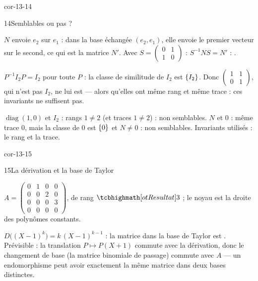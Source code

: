 \begin{blocLivre}{cor-13-14}
\begin{corrige}{14}{Semblables ou pas ?}
\begin{questions}
  \item $N$ envoie $e_2$ sur $e_1$ : dans la base échangée $(e_2,e_1)$,
    elle envoie le premier vecteur sur le second, ce qui est la matrice
    $N'$. Avec $S=\begin{pmatrix}0&1\\1&0\end{pmatrix}$ :
    $S^{-1}NS=N'$ : .
  \item $P^{-1}I_2P=I_2$ pour toute $P$ : la classe de similitude de
    $I_2$ est $\left\{I_2\right\}$. Donc $\begin{pmatrix}1&1\\0&1\end{pmatrix}$,
    qui n'est pas $I_2$, ne lui est  — alors
    qu'elles ont même rang et même trace : ces invariants ne suffisent pas.
  \item $\operatorname{diag}(1,0)$ et $I_2$ : rangs $1\neq2$ (et traces
    $1\neq2$) : non semblables. $N$ et $0$ : même trace $0$, mais la
    classe de $0$ est $\left\{0\right\}$ et $N\neq0$ : non semblables. Invariants
    utilisés : le rang et la trace.
\end{questions}
\end{corrige}
\end{blocLivre}

\begin{blocLivre}{cor-13-15}
\begin{corrige}{15}{La dérivation et la base de Taylor}
\begin{questions}
  \item $A=\begin{pmatrix}0&1&0&0\\0&0&2&0\\0&0&0&3\\0&0&0&0\end{pmatrix}$,
    de rang $\res{3}$ ; le noyau est la droite des polynômes constants.
  \item $D\bigl((X-1)^{k}\bigr)=k\,(X-1)^{k-1}$ : la matrice dans la base
    de Taylor est . Prévisible : la
    translation $P\mapsto P(X+1)$ commute avec la dérivation, donc le
    changement de base (la matrice binomiale de passage) commute avec $A$
    — un endomorphisme peut avoir exactement la même matrice dans deux
    bases distinctes.
\end{questions}
\end{corrige}
\end{blocLivre}

